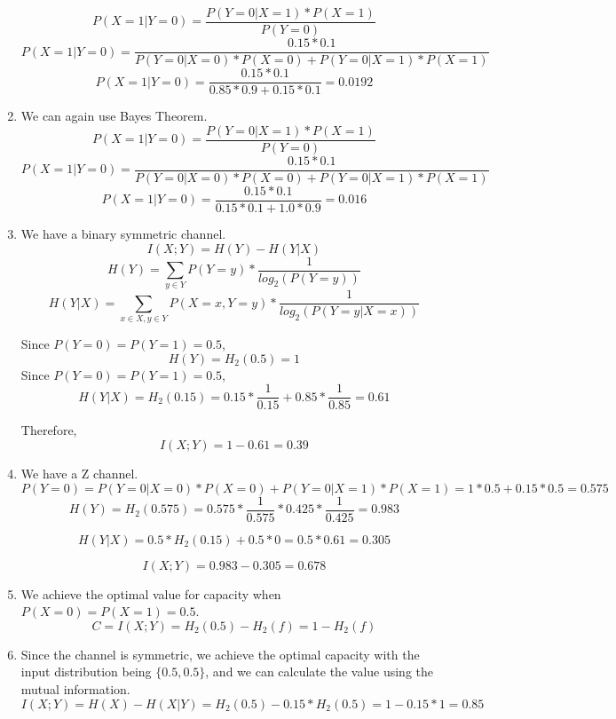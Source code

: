 \documentclass{article}
\begin{document}
\begin{enumerate}
	      \[P(X = 1 | Y = 0) = \frac{P(Y = 0 | X = 1) * P(X = 1)}{P(Y = 0)}\]
	      \[P(X = 1 | Y = 0) = \frac{0.15 * 0.1}{P(Y = 0 | X = 0)* P(X = 0) + P(Y = 0 | X = 1) * P(X = 1)}\]
	      \[P(X = 1 | Y = 0) = \frac{0.15 * 0.1}{0.85 * 0.9 + 0.15 * 0.1} = 0.0192\]
	\item We can again use Bayes Theorem.
	      \[P(X = 1 | Y = 0) = \frac{P(Y = 0 | X = 1) * P(X = 1)}{P(Y = 0)}\]
	      \[P(X = 1 | Y = 0) = \frac{0.15 * 0.1}{P(Y = 0 | X = 0)* P(X = 0) + P(Y = 0 | X = 1) * P(X = 1)}\]
	      \[P(X = 1 | Y = 0) = \frac{0.15 * 0.1}{0.15 * 0.1 + 1.0 * 0.9} = 0.016\]
	\item We have a binary symmetric channel.
	      \[I(X; Y) = H(Y) - H(Y | X)\]
	      \[H(Y) = \sum_{y \in Y} P(Y = y) * \frac{1}{log_2(P(Y = y))}\]
	      \[H(Y | X) = \sum_{x \in X, y \in Y} P(X = x, Y = y) * \frac{1}{log_2(P(Y = y | X = x))}\]

	      Since \(P(Y = 0) = P(Y = 1) = 0.5\),
	      \[H(Y) = H_2(0.5) = 1\]
	      Since \(P(Y = 0) = P(Y = 1) = 0.5\),
	      \[H(Y | X) = H_2(0.15) = 0.15 * \frac{1}{0.15} + 0.85 * \frac{1}{0.85} = 0.61\]

	      Therefore,
	      \[I(X; Y) = 1 - 0.61 = 0.39\]

	\item We have a Z channel.
	      \[P(Y = 0) = P(Y = 0 | X = 0) * P(X = 0) + P(Y = 0 | X = 1) * P(X = 1) = 1 * 0.5 + 0.15 * 0.5 = 0.575\]
	      \[H(Y) = H_2(0.575) = 0.575 * \frac{1}{0.575} * 0.425 * \frac{1}{0.425} = 0.983\]

	      \[H(Y | X) = 0.5 * H_2(0.15) + 0.5 * 0 = 0.5 * 0.61 = 0.305\]

	      \[I(X; Y) = 0.983 - 0.305 = 0.678\]

	\item We achieve the optimal value for capacity when \(P(X = 0) = P(X = 1) = 0.5\).
	      \[C = I(X; Y) = H_2(0.5) - H_2(f) = 1 - H_2(f)\]

	\item Since the channel is symmetric, we achieve the optimal capacity with the input distribution being \(\{0.5, 0.5\}\), and we can calculate the value
	      using the mutual information.
	      \[I(X; Y) = H(X) - H(X | Y) = H_2(0.5) - 0.15 * H_2(0.5) = 1 - 0.15 * 1 = 0.85\]

\end{enumerate}


\nocite{*}
\end{document}
